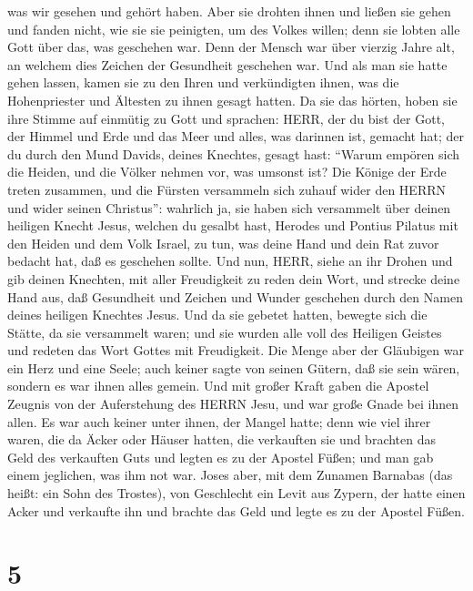 was wir gesehen und gehört haben.  Aber sie drohten ihnen
und ließen sie gehen und fanden nicht, wie sie sie peinigten, um des
Volkes willen; denn sie lobten alle Gott über das, was geschehen war.
 Denn der Mensch war über vierzig Jahre alt, an welchem
dies Zeichen der Gesundheit geschehen war.  Und als man sie
hatte gehen lassen, kamen sie zu den Ihren und verkündigten ihnen, was
die Hohenpriester und Ältesten zu ihnen gesagt hatten.  Da
sie das hörten, hoben sie ihre Stimme auf einmütig zu Gott und sprachen:
HERR, der du bist der Gott, der Himmel und Erde und das Meer und alles,
was darinnen ist, gemacht hat;  der du durch den Mund
Davids, deines Knechtes, gesagt hast: ``Warum empören sich die Heiden,
und die Völker nehmen vor, was umsonst ist?  Die Könige der
Erde treten zusammen, und die Fürsten versammeln sich zuhauf wider den
HERRN und wider seinen Christus'':  wahrlich ja, sie haben
sich versammelt über deinen heiligen Knecht Jesus, welchen du gesalbt
hast, Herodes und Pontius Pilatus mit den Heiden und dem Volk Israel,
 zu tun, was deine Hand und dein Rat zuvor bedacht hat, daß
es geschehen sollte.  Und nun, HERR, siehe an ihr Drohen
und gib deinen Knechten, mit aller Freudigkeit zu reden dein Wort,
 und strecke deine Hand aus, daß Gesundheit und Zeichen und
Wunder geschehen durch den Namen deines heiligen Knechtes Jesus.
 Und da sie gebetet hatten, bewegte sich die Stätte, da sie
versammelt waren; und sie wurden alle voll des Heiligen Geistes und
redeten das Wort Gottes mit Freudigkeit.  Die Menge aber
der Gläubigen war ein Herz und eine Seele; auch keiner sagte von seinen
Gütern, daß sie sein wären, sondern es war ihnen alles gemein.
 Und mit großer Kraft gaben die Apostel Zeugnis von der
Auferstehung des HERRN Jesu, und war große Gnade bei ihnen allen.
 Es war auch keiner unter ihnen, der Mangel hatte; denn wie
viel ihrer waren, die da Äcker oder Häuser hatten, die verkauften sie
und brachten das Geld des verkauften Guts  und legten es zu
der Apostel Füßen; und man gab einem jeglichen, was ihm not war.
 Joses aber, mit dem Zunamen Barnabas (das heißt: ein Sohn
des Trostes), von Geschlecht ein Levit aus Zypern,  der
hatte einen Acker und verkaufte ihn und brachte das Geld und legte es zu
der Apostel Füßen.

\hypertarget{section-4}{%
\section{5}\label{section-4}}

